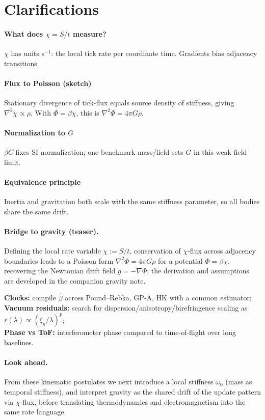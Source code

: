 \section*{Clarifications}
\paragraph{What does \(\chi=S/t\) measure?}
\(\chi\) has units s\(^{-1}\): the local tick rate per coordinate time. Gradients bias adjacency transitions.
\paragraph{Flux to Poisson (sketch)}
Stationary divergence of tick-flux equals source density of stiffness, giving \(\nabla^2\chi\propto \rho\). With \(\Phi=\beta\chi\), this is \(\nabla^2\Phi=4\pi G\rho\).
\paragraph{Normalization to \(G\)}
\(\beta C\) fixes SI normalization; one benchmark mass/field sets \(G\) in this weak-field limit.
\paragraph{Equivalence principle}
Inertia and gravitation both scale with the same stiffness parameter, so all bodies share the same drift.

\paragraph{Bridge to gravity (teaser).}
Defining the local rate variable $\chi:=S/t$, conservation of $\chi$-flux across adjacency boundaries leads to a Poisson form
$\nabla^2\Phi=4\pi G\rho$ for a potential $\Phi=\beta\chi$, recovering the Newtonian drift field $g=-\nabla\Phi$;
the derivation and assumptions are developed in the companion gravity note.

\begin{tcolorbox}[title=What to measure next]
\textbf{Clocks:} compile $\hat\beta$ across Pound--Rebka, GP-A, HK with a common estimator;\\
\textbf{Vacuum residuals:} search for dispersion/anisotropy/birefringence scaling as $r(\lambda)\propto(\xi_g/\lambda)^p$;\\
\textbf{Phase vs ToF:} interferometer phase compared to time-of-flight over long baselines.
\end{tcolorbox}

\paragraph{Look ahead.}
From these kinematic postulates we next introduce a local stiffness $\omega_0$ (mass as temporal stiffness),
and interpret gravity as the shared drift of the update pattern via $\chi$-flux, before translating thermodynamics and
electromagnetism into the same rate language.